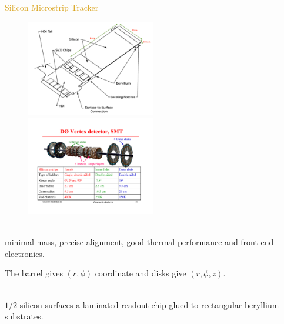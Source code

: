 \begin{frame}{\textcolor{Goldenrod}{Silicon Microstrip Tracker}}
  \begin{overlayarea}{\textwidth}{\textheight}
    \begin{figure}[h]\centering
      \includegraphics[height=0.3\textheight,width=0.5\textwidth]{./Images/09_SMT_03}
      \includegraphics[height=0.3\textheight,width=0.5\textwidth]{./Images/09_SMT}
    \end{figure}
    
    \itt
  \item {}\\ minimal mass, precise
    alignment, good thermal performance and front-end electronics.
  \item The barrel gives $(r, \phi)$ coordinate and disks give $(r,
    \phi, z)$.
  \item {}\\ $1/2$
    silicon surfaces a laminated readout chip
    glued to rectangular beryllium substrates.
    \tti
\end{overlayarea}
\end{frame}

